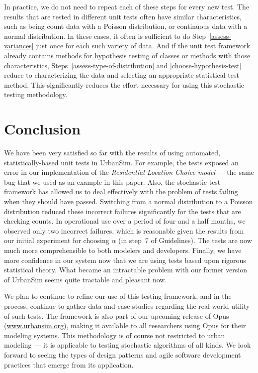 \documentclass{sig-alternate-preprint}
\begin{document}
In practice, we do not need to repeat each of these steps for every new
test.  The results that are tested in different unit tests often have similar
characteristics, such as being count data with a Poisson distribution, or
continuous data with a normal distribution.  In these cases, it often is
sufficient to do Step~\ref{assess-variances} just once for each such
variety of data.  And if the unit test framework already contains methods
for hypothesis testing of classes or methods with those characteristics,
Steps~\ref{assess-type-of-distribution} and \ref{choose-hypothesis-test}
reduce to characterizing the data and selecting an appropriate statistical
test method.  This significantly reduces the effort necessary for using
this stochastic testing methodology.


\section{Conclusion}
\label{sec:conclusion}

We have been very satisfied so far with the results of using automated,
statistically-based unit tests in UrbanSim.  For example, the tests exposed an
error in our implementation of the \emph{Residential Location Choice model}
--- the same bug that we used as an example in this paper.  Also, the
stochastic test framework has allowed us to deal effectively with the problem
of tests failing when they should have passed. Switching from a normal
distribution to a Poisson distribution reduced these incorrect failures
significantly for the tests that are checking counts.  In operational use
over a period of 
four and a half
months, we observed only two incorrect failures, which is reasonable given
the results from our
initial experiment for choosing $\alpha$ (in step~7 of
Guidelines). The tests are now much more comprehensible to both modelers and
developers.  Finally, we have more confidence in our system now that we are
using tests based upon rigorous statistical theory.  What became an
intractable problem with our former version of UrbanSim seems quite tractable
and pleasant now.

We plan to continue to refine our use of this testing framework, and in the
process, continue to gather data and case studies regarding the real-world
utility of such tests.  The framework is also part of our upcoming
release of Opus (\url{www.urbansim.org}), 
making it available to all researchers using Opus for
their modeling systems.  This methodology is of course not restricted to
urban modeling --- it is applicable to testing stochastic algorithms of all
kinds.  We look forward to seeing the types of design patterns and agile
software development practices that emerge from its application.
\end{document}
